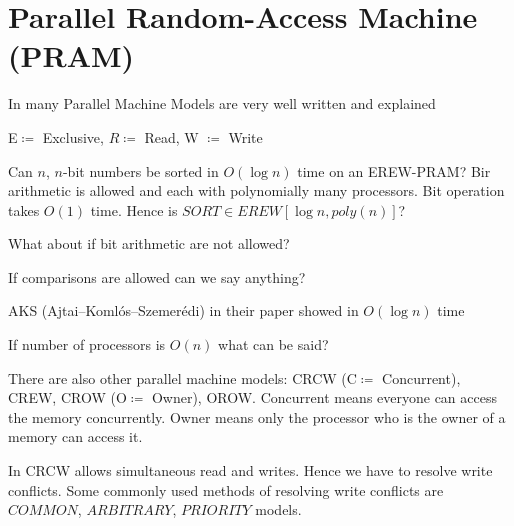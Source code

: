 \section{Parallel Random-Access Machine (PRAM)}
In \cite{karpramachandran} many Parallel Machine Models are very well written and explained
\begin{definition}
	E$\coloneqq$ Exclusive, $R\coloneqq$ Read, W $\coloneqq $ Write 
\end{definition}
\begin{question}
	Can $n$, $n$-bit numbers be sorted in $O(\log n)$ time on an EREW-PRAM? Bir arithmetic is allowed and each with polynomially many processors. Bit operation takes $O(1)$ time. Hence is $SORT\in EREW[\log n,poly(n)]$?
\end{question}

\begin{question}
	What about if bit arithmetic are not allowed?
\end{question}
\begin{question}
	If comparisons are allowed can we say anything?
\end{question}
\begin{answer}
	AKS (Ajtai–Koml\'{o}s–Szemer\'{e}di) in their paper \cite{akssortparallel} showed in $O(\log n)$ time
\end{answer}

\begin{question}
	If number of processors is $O(n)$ what can be said?
\end{question}
There are also other parallel machine models: CRCW (C$\coloneqq$ Concurrent), CREW, CROW (O$\coloneqq$ Owner), OROW. Concurrent means everyone can access the memory concurrently. Owner means only the processor who is the owner of a memory can access it. 

In CRCW allows simultaneous read and writes. Hence we have to resolve write conflicts. Some commonly used methods of resolving write conflicts are $COMMON$, $ARBITRARY$, $PRIORITY$ models.  

